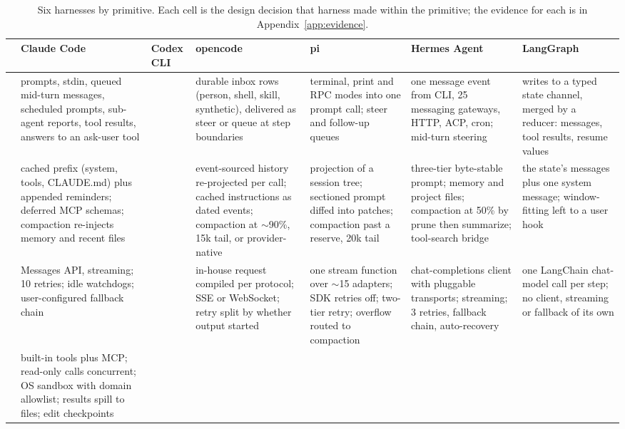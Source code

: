 \begin{table}[p]
\centering
\scriptsize
\setlength{\tabcolsep}{3pt}
\renewcommand{\arraystretch}{1.2}
\caption{Six harnesses by primitive. Each cell is the design decision that harness made within the primitive; the evidence for each is in Appendix~\ref{app:evidence}.}
\label{tab:summary}
\begin{tabularx}{\linewidth}{@{}>{\bfseries}p{1.9cm}YYYYYY@{}}
\toprule
& Claude Code & Codex CLI & opencode & pi & Hermes Agent & LangGraph \\
\midrule
{} &
prompts, stdin, queued mid-turn messages, scheduled prompts, sub-agent reports, tool results, answers to an ask-user tool &
 &
durable inbox rows (person, shell, skill, synthetic), delivered as steer or queue at step boundaries &
terminal, print and RPC modes into one prompt call; steer and follow-up queues &
one message event from CLI, 25 messaging gateways, HTTP, ACP, cron; mid-turn steering &
writes to a typed state channel, merged by a reducer: messages, tool results, resume values \\
\addlinespace
{} &
cached prefix (system, tools, CLAUDE.md) plus appended reminders; deferred MCP schemas; compaction re-injects memory and recent files &
 &
event-sourced history re-projected per call; cached instructions as dated events; compaction at $\sim$90\%, 15k tail, or provider-native &
projection of a session tree; sectioned prompt diffed into patches; compaction past a reserve, 20k tail &
three-tier byte-stable prompt; memory and project files; compaction at 50\% by prune then summarize; tool-search bridge &
the state's messages plus one system message; window-fitting left to a user hook \\
\addlinespace
{}\newline{} &
Messages API, streaming; 10 retries; idle watchdogs; user-configured fallback chain &
 &
in-house request compiled per protocol; SSE or WebSocket; retry split by whether output started &
one stream function over $\sim$15 adapters; SDK retries off; two-tier retry; overflow routed to compaction &
chat-completions client with pluggable transports; streaming; 3 retries, fallback chain, auto-recovery &
one LangChain chat-model call per step; no client, streaming or fallback of its own \\
\addlinespace
{} &
built-in tools plus MCP; read-only calls concurrent; OS sandbox with domain allowlist; results spill to files; edit checkpoints &

\end{tabularx}
\end{table}
